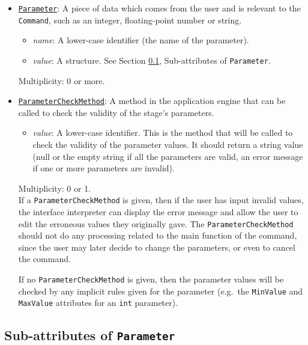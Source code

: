 \documentclass[11pt]{article}
\begin{document}
\begin{itemize}

\item \underline{\tt Parameter}:  A piece of data
which comes from the user and is relevant
to the {\tt Command}, such as an integer, floating-point
number or string.
\begin{itemize}
\item {\it name}: A lower-case identifier (the name of the parameter).
\item {\it value}: A structure.  See Section
  \ref{sub-attr-param-sec}, Sub-attributes of {\tt Parameter}.
\end{itemize}
Multiplicity: 0 or more. \\

\item \underline{\tt ParameterCheckMethod}:  A method in the
application engine that can be
called to check the validity of the stage's parameters.
\begin{itemize}
\item {\it value}: A lower-case identifier.  This is the method
  that will be called to check the validity of the parameter values.
  It should return a string value (null or the empty string if all
  the parameters are valid, an error message if one or more parameters
  are invalid).
\end{itemize}
Multiplicity: 0 or 1. \\
If a {\tt ParameterCheckMethod} is given, then if the user has
input invalid values, the interface interpreter can display the
error message and allow the user to edit the erroneous values
they originally gave.  The {\tt ParameterCheckMethod}
should not do any processing related to the main function of the
command, since the user may later decide to change the parameters, or
even to cancel the command.

If no {\tt ParameterCheckMethod} is given, then the parameter
values will be checked by any implicit rules given for the
parameter (e.g.\ the {\tt MinValue} and {\tt MaxValue} attributes
for an {\tt int} parameter).

\end{itemize}


\subsection{Sub-attributes of {\tt Parameter}}
\label{sub-attr-param-sec}
\end{document}
